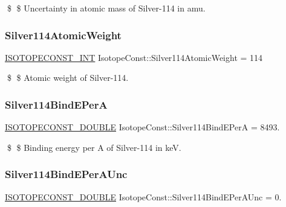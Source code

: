 \$ \$ Uncertainty in atomic mass of Silver-\/114 in amu. \mbox{\label{group___isotope_const-_silver-_ag114_ga6392264d48077f15e401c9c979a7ead4}} 
\subsubsection{\texorpdfstring{Silver114\+Atomic\+Weight}{Silver114AtomicWeight}}
{\footnotesize\ttfamily \mbox{\hyperlink{group___isotope_const-_macros_ga5f18360b3e99483a35c32d789e62621c}{I\+S\+O\+T\+O\+P\+E\+C\+O\+N\+S\+T\+\_\+\+I\+NT}} Isotope\+Const\+::\+Silver114\+Atomic\+Weight = 114}

\$ \$ Atomic weight of Silver-\/114. \mbox{\label{group___isotope_const-_silver-_ag114_gaa83ed51f12c978ebeef0f48a4fab1dc4}} 
\subsubsection{\texorpdfstring{Silver114\+Bind\+E\+PerA}{Silver114BindEPerA}}
{\footnotesize\ttfamily \mbox{\hyperlink{group___isotope_const-_macros_ga8f45a7272ce02c0b4c65c44636ed719a}{I\+S\+O\+T\+O\+P\+E\+C\+O\+N\+S\+T\+\_\+\+D\+O\+U\+B\+LE}} Isotope\+Const\+::\+Silver114\+Bind\+E\+PerA = 8493.}

\$ \$ Binding energy per A of Silver-\/114 in keV. \mbox{\label{group___isotope_const-_silver-_ag114_gae4669c039a1be620495dac55435d9587}} 
\subsubsection{\texorpdfstring{Silver114\+Bind\+E\+Per\+A\+Unc}{Silver114BindEPerAUnc}}
{\footnotesize\ttfamily \mbox{\hyperlink{group___isotope_const-_macros_ga8f45a7272ce02c0b4c65c44636ed719a}{I\+S\+O\+T\+O\+P\+E\+C\+O\+N\+S\+T\+\_\+\+D\+O\+U\+B\+LE}} Isotope\+Const\+::\+Silver114\+Bind\+E\+Per\+A\+Unc = 0.}


